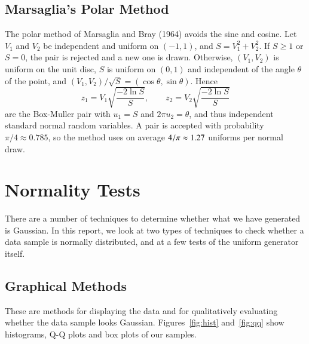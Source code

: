 \documentclass[12pt,a4paper]{article}
\begin{document}
\subsection{Marsaglia's Polar Method}

The polar method of Marsaglia and Bray (1964) avoids the sine and cosine. Let $V_1$ and $V_2$ be independent and uniform on $(-1,1)$, and $S = V_1^2 + V_2^2$. If $S \ge 1$ or $S = 0$, the pair is rejected and a new one is drawn. Otherwise, $(V_1, V_2)$ is uniform on the unit disc, $S$ is uniform on $(0,1)$ and independent of the angle $\theta$ of the point, and $(V_1, V_2)/\sqrt{S} = (\cos\theta, \sin\theta)$. Hence
\[
z_1 = V_1\sqrt{\frac{-2\ln S}{S}}, \qquad z_2 = V_2\sqrt{\frac{-2\ln S}{S}}
\]
are the Box-Muller pair with $u_1 = S$ and $2\pi u_2 = \theta$, and thus independent standard normal random variables. A pair is accepted with probability $\pi/4 \approx 0.785$, so the method uses on average $4/\pi \approx 1.27$ uniforms per normal draw.

\section{Normality Tests}

There are a number of techniques to determine whether what we have generated is Gaussian. In this report, we look at two types of techniques to check whether a data sample is normally distributed, and at a few tests of the uniform generator itself.

\subsection{Graphical Methods}

These are methods for displaying the data and for qualitatively evaluating whether the data sample looks Gaussian. Figures~\ref{fig:hist} and~\ref{fig:qq} show histograms, Q-Q plots and box plots of our samples.
\end{document}
